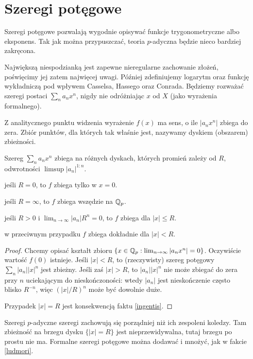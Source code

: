\section{Szeregi potęgowe}
Szeregi  potęgowe pozwalają wygodnie opisywać funkcje trygonometryczne albo eksponens.
Tak jak można przypuszczać, teoria $p$-adyczna będzie nieco bardziej zakręcona.

Największą niespodzianką jest zapewne nieregularne zachowanie złożeń, poświęcimy jej zatem najwięcej uwagi.
Później zdefiniujemy logarytm oraz funkcję wykładniczą pod wpływem Casselsa, Hassego oraz Conrada.
Będziemy rozważać szeregi postaci $\sum_n a_n x^n$, nigdy nie odróżniając $x$ od $X$ (jako wyrażenia formalnego).

Z analitycznego punktu widzenia wyrażenie $f(x)$ ma sens, o ile $|a_n x^n|$ zbiega do zera.
Zbiór punktów, dla których tak właśnie jest, nazywamy dyskiem (obszarem) zbieżności.

\begin{fakt}
	Szereg $\sum_n a_n x^n$ zbiega na różnych dyskach, których promień zależy od $R$, odwrotności $\limsup |a_n|^{1:n}$.
	\begin{enumx}
	\item jeśli $R = 0$, to $f$ zbiega tylko w $x = 0$.
	\item jeśli $R = \infty$, to $f$ zbiega wszędzie na $\mathbb Q_p$.
	\item jeśli $R > 0$ i $\lim_{n \to \infty} |a_n| R^n = 0$, to $f$ zbiega dla $|x| \le R$.
	\item w przeciwnym przypadku $f$ zbiega dokładnie dla $|x| < R$.
	\end{enumx}
\end{fakt}

\begin{proof}
	Chcemy opisać kształt zbioru $\{x \in \mathbb Q_p : \lim_{n \to \infty} |a_n x^n| = 0\}$.
	Oczywiście wartość $f(0)$ istnieje.
	Jeśli $|x| < R $, to (rzeczywisty) szereg potęgowy $\sum_n |a_n| |x|^n$ jest zbieżny.
	Jeśli zaś $|x| > R $, to $|a_n| |x|^n$ nie może zbiegać do zera przy $n$ uciekającym do nieskończoności: wtedy $|a_n|$ jest nieskończenie często blisko $R ^{-n}$, więc $(|x|/R )^n$ może być dowolnie duże.
	
	Przypadek $|x| = R $ jest konsekwencją faktu \ref{ingentis}.
\end{proof}

Szeregi $p$-adyczne szeregi zachowują się porządniej niż ich zespoleni koledzy.
Tam zbieżność na brzegu dysku $\{|x| = R \}$ jest nieprzewidywalna, tutaj brzegu po prostu nie ma.
Formalne szeregi potęgowe można dodawać i mnożyć, jak w fakcie \ref{ludmori}.

